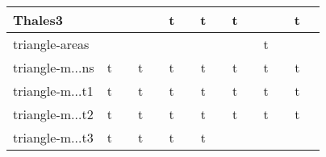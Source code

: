 {\begin{longtable}{|l|*{7}{cr|}}
\\ \hline
\cellcolor{blue!10}Thales3 
& \cellcolor{yellow!25} & \cellcolor{yellow!25}{ 4} 
& \cellcolor{yellow!25} & \cellcolor{yellow!25}{ 3} 
& \cellcolor{green!50}t & \cellcolor{green!50}{\bf 39} 
& \cellcolor{green!30}t & \cellcolor{green!30}{\sl 261} 
& \cellcolor{green!40}t & \cellcolor{green!40}{ 126} 
& \cellcolor{yellow!25} & \cellcolor{yellow!25}{ 89} 
& \cellcolor{green!30}t & \cellcolor{green!30}{ 252} 
\\ \hline
\cellcolor{blue!10}triangle-areas 
& \cellcolor{yellow!25} & \cellcolor{yellow!25}{ 4} 
& \cellcolor{yellow!25} & \cellcolor{yellow!25}{ 4} 
& \cellcolor{yellow!25} & \cellcolor{yellow!25}{ 52} 
& \cellcolor{yellow!25} & \cellcolor{yellow!25}{ 290} 
& \cellcolor{yellow!25} & \cellcolor{yellow!25}{ 68} 
& \cellcolor{green!20}t & \cellcolor{green!20}{\bf 318} 
& \cellcolor{yellow!25} & \cellcolor{yellow!25}{ 338} 
\\ \hline
\cellcolor{blue!10}triangle-m$\ldots$ns 
& \cellcolor{green!60}t & \cellcolor{green!60}{\bf 8} 
& \cellcolor{green!50}t & \cellcolor{green!50}{ 40} 
& \cellcolor{green!50}t & \cellcolor{green!50}{ 40} 
& \cellcolor{green!30}t & \cellcolor{green!30}{ 242} 
& \cellcolor{green!20}t & \cellcolor{green!20}{\sl 500} 
& \cellcolor{green!40}t & \cellcolor{green!40}{ 73} 
& \cellcolor{green!60}t & \cellcolor{green!60}{ 4} 
\\ \hline
\cellcolor{blue!10}triangle-m$\ldots$t1 
& \cellcolor{green!60}t & \cellcolor{green!60}{\bf 7} 
& \cellcolor{green!60}t & \cellcolor{green!60}{ 15} 
& \cellcolor{green!50}t & \cellcolor{green!50}{ 33} 
& \cellcolor{green!30}t & \cellcolor{green!30}{\sl 245} 
& \cellcolor{green!40}t & \cellcolor{green!40}{ 71} 
& \cellcolor{green!40}t & \cellcolor{green!40}{ 79} 
& \cellcolor{green!60}t & \cellcolor{green!60}{ 8} 
\\ \hline
\cellcolor{blue!10}triangle-m$\ldots$t2 
& \cellcolor{green!60}t & \cellcolor{green!60}{\bf 7} 
& \cellcolor{green!60}t & \cellcolor{green!60}{ 13} 
& \cellcolor{green!50}t & \cellcolor{green!50}{ 32} 
& \cellcolor{green!30}t & \cellcolor{green!30}{\sl 241} 
& \cellcolor{green!40}t & \cellcolor{green!40}{ 77} 
& \cellcolor{green!40}t & \cellcolor{green!40}{ 71} 
& \cellcolor{green!60}t & \cellcolor{green!60}{ 7} 
\\ \hline
\cellcolor{blue!10}triangle-m$\ldots$t3 
& \cellcolor{green!60}t & \cellcolor{green!60}{\bf 6} 
& \cellcolor{green!60}t & \cellcolor{green!60}{ 10} 
& \cellcolor{green!50}t & \cellcolor{green!50}{ 36} 
& \cellcolor{green!30}t & \cellcolor{green!30}{\sl 238} 

\end{longtable}}
